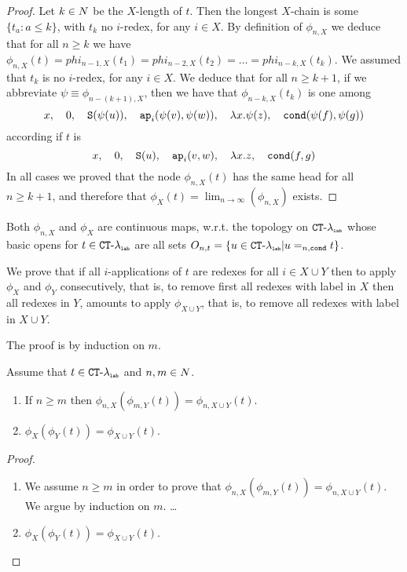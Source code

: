 \begin{proof}
Let $k\in {N}$ be the $X$-length of $t$. Then the longest $X$-chain is some $\{t_a : a \le k\}$,
with $t_k$ no $i$-redex, for any $i \in X$.
By definition of $\phi_{n,X}$ we deduce that for all $n \ge k$ we have $\phi_{n,X}(t)
= phi_{n-1,X}(t_1) = phi_{n-2,X}(t_2) = \ldots = phi_{n-k,X}(t_k)$. 
We assumed that $t_k$ is no $i$-redex, for any $i \in X$.
We deduce that for all $n \ge k+1$, if we abbreviate $\psi \equiv \phi_{n-(k+1),X}$, then
we have that $\phi_{n-k,X}(t_k)$ is one among
$$ 
x, \ \ \  
0, \ \ \  
{\tt S}(\psi(u)),  \ \ \  
{\tt ap}_i(\psi(v), \psi(w)), \ \ \  
\lambda x.\psi(z), \ \ \  
{\tt cond}(\psi(f), \psi(g))
$$
according if $t$ is
$$ 
x, \ \ \  
0, \ \ \  
{\tt S}(u),  \ \ \  
{\tt ap}_i(v,w), \ \ \  
\lambda x.z, \ \ \  
{\tt cond}(f,g)
$$
In all cases we proved that the node $\phi_{n,X}(t)$ has the same head for all $n \ge k+1$,
and therefore that $\phi_X(t) = \lim_{n \rightarrow \infty}(\phi_{n,X})$ exists.
\end{proof}


Both $\phi_{n,X}$ and $\phi_X$ are continuous maps, w.r.t. the topology on ${{ {\tt CT} \mbox{-} \lambda}_{\mbox{\tiny \tt lab}}}$
whose basic opens for $t \in { { {\tt CT} \mbox{-} \lambda} _ {\mbox{\tiny \tt lab}} }$ are all sets 
$O_{n,t} = \{u \in { { {\tt CT} \mbox{-} \lambda} _ {\mbox{\tiny \tt lab}} } | u =_{n,{\tt cond}} t\}$.


We prove that if all $i$-applications of $t$ are redexes for all $i \in X \cup Y$
then to apply $\phi_X$ and $\phi_Y$ consecutively, that is, to remove first all redexes with label in $X$
then all redexes in $Y$, amounts to apply $\phi_{X \cup Y}$,  that is, to remove 
all redexes with label in $X \cup Y$.

The proof is by induction on $m$.

\begin{lemma}
Assume that $t \in { { {\tt CT} \mbox{-} \lambda} _ {\mbox{\tiny \tt lab}} }$ and $n, m \in {N}$. 
\begin{enumerate}
\item
If $n \ge m$ then $\phi_{n,X}(\phi_{m,Y}(t)) = \phi_{n,X \cup Y}(t)$. 
\item
$\phi_{X}(\phi_{Y}(t)) = \phi_{X \cup Y}(t)$. 
\end{enumerate}
\end{lemma}

\begin{proof}
\begin{enumerate}
\item
We assume $n \ge m$ in order to prove that $\phi_{n,X}(\phi_{m,Y}(t)) = \phi_{n,X \cup Y}(t)$. 
We argue by induction on $m$.
\ldots

\item
$\phi_{X}(\phi_{Y}(t)) = \phi_{X \cup Y}(t)$.
\end{enumerate}
\end{proof}


